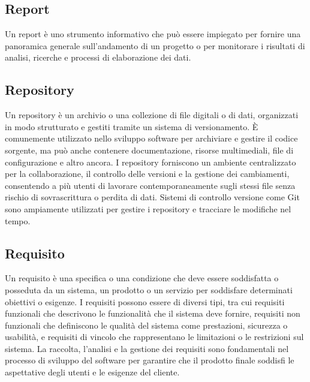 \vspace{2em}
\subsection*{Report}
\par Un report è uno strumento informativo che può essere impiegato per fornire una panoramica generale sull’andamento di un progetto o per monitorare i risultati di analisi, ricerche e processi di elaborazione dei dati.

\vspace{2em}
\subsection*{Repository}
\par Un repository è un archivio o una collezione di file digitali o di dati, organizzati in modo strutturato e gestiti tramite un sistema di versionamento. È comunemente utilizzato nello sviluppo software per archiviare e gestire il codice sorgente, ma può anche contenere documentazione, risorse multimediali, file di configurazione e altro ancora. I repository forniscono un ambiente centralizzato per la collaborazione, il controllo delle versioni e la gestione dei cambiamenti, consentendo a più utenti di lavorare contemporaneamente sugli stessi file senza rischio di sovrascrittura o perdita di dati. Sistemi di controllo versione come Git sono ampiamente utilizzati per gestire i repository e tracciare le modifiche nel tempo.

\vspace{2em}
\subsection*{Requisito}
\par Un requisito è una specifica o una condizione che deve essere soddisfatta o posseduta da un sistema, un prodotto o un servizio per soddisfare determinati obiettivi o esigenze. I requisiti possono essere di diversi tipi, tra cui requisiti funzionali che descrivono le funzionalità che il sistema deve fornire, requisiti non funzionali che definiscono le qualità del sistema come prestazioni, sicurezza o usabilità, e requisiti di vincolo che rappresentano le limitazioni o le restrizioni sul sistema. La raccolta, l'analisi e la gestione dei requisiti sono fondamentali nel processo di sviluppo del software per garantire che il prodotto finale soddisfi le aspettative degli utenti e le esigenze del cliente.

